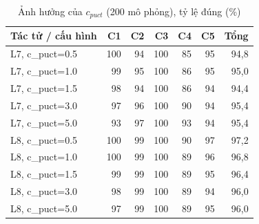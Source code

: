 \begin{table}[H]
  \centering
  \small
  \caption{Ảnh hưởng của $c_{puct}$ (200 mô phỏng), tỷ lệ đúng (\%)}
  \label{tab:cs-ct-cpuct}
  \begin{tabular}{lrrrrrr}
    \toprule
    Tác tử / cấu hình & C1 & C2 & C3 & C4 & C5 & Tổng \\
    \midrule
    L7, c\_puct=0.5 & 100 & 94 & 100 & 85 & 95 & 94,8 \\
    L7, c\_puct=1.0 & 99 & 95 & 100 & 86 & 95 & 95,0 \\
    L7, c\_puct=1.5 & 98 & 94 & 100 & 86 & 94 & 94,4 \\
    L7, c\_puct=3.0 & 97 & 96 & 100 & 90 & 94 & 95,4 \\
    L7, c\_puct=5.0 & 93 & 97 & 100 & 93 & 94 & 95,4 \\
    L8, c\_puct=0.5 & 100 & 99 & 100 & 90 & 97 & 97,2 \\
    L8, c\_puct=1.0 & 100 & 99 & 100 & 89 & 96 & 96,8 \\
    L8, c\_puct=1.5 & 99 & 99 & 100 & 89 & 95 & 96,4 \\
    L8, c\_puct=3.0 & 98 & 99 & 100 & 89 & 94 & 96,0 \\
    L8, c\_puct=5.0 & 97 & 99 & 100 & 89 & 95 & 96,0 \\
    \bottomrule
  \end{tabular}
\end{table}
